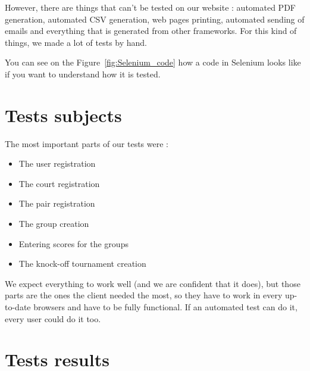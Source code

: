 However, there are things that can't be tested on our website : automated PDF
generation, automated CSV generation, web pages printing, automated sending of
emails and everything that is generated from other frameworks. For this kind of
things, we made a lot of tests by hand. \newline

You can see on the Figure~\ref{fig:Selenium_code} how a code in Selenium looks
like if you want to understand how it is tested.




\section{Tests subjects}
\label{sec:Tests subjects}

The most important parts of our tests were :

\bigskip
\begin{itemize}
    \item The user registration
    \item The court registration
    \item The pair registration
    \item The group creation
    \item Entering scores for the groups
    \item The knock-off tournament creation
\end{itemize}
\bigskip

We expect everything to work well (and we are confident that it does), but those
parts are the ones the client needed the most, so they have to work in every
up-to-date browsers and have to be fully functional. If an automated test can
do it, every user could do it too. \newline

\section{Tests results}
\label{sec:Tests results}

